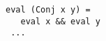 

\begin{figure}[!t]
  \centering
  \begin{minipage}{0.55\textwidth}
    \begin{lstlisting}[frame=tb]
 eval (Conj x y) =
   eval x && eval y
 ...
    \end{lstlisting}
  \end{minipage}
\end{figure}

